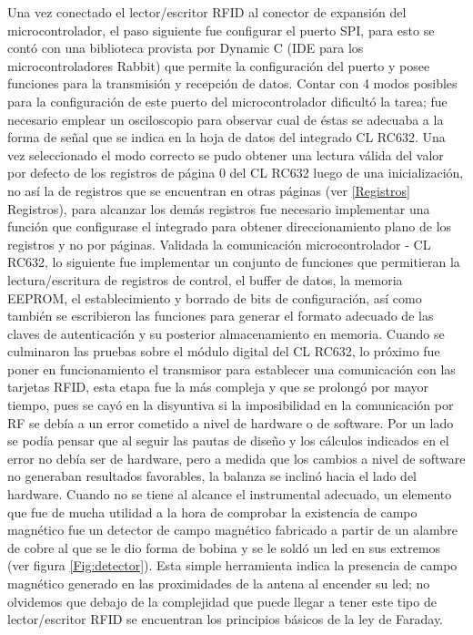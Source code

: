 Una vez conectado el lector/escritor RFID al conector de expansión del microcontrolador, el paso siguiente fue configurar el puerto SPI, para esto se contó con una biblioteca provista por Dynamic C (IDE para los microcontroladores Rabbit) que permite la configuración del puerto y posee funciones para la transmisión y recepción de datos. Contar con 4 modos posibles para la configuración de este puerto del microcontrolador dificultó la tarea; fue necesario emplear un osciloscopio para observar cual de éstas se adecuaba a la forma de señal que se indica en la hoja de datos del integrado  CL RC632. Una vez seleccionado el modo correcto se pudo obtener una lectura válida del valor por defecto de los registros de página 0 del CL RC632 luego de una inicialización, no así la de registros que se encuentran en otras páginas (ver \ref{Registros} Registros), para alcanzar los demás registros fue necesario implementar una función que configurase el integrado para obtener direccionamiento plano de los registros y no por páginas.
Validada la comunicación microcontrolador - CL RC632, lo siguiente fue implementar un conjunto de funciones que permitieran la lectura/escritura de registros de control, el buffer de datos, la memoria EEPROM, el establecimiento y borrado de bits de configuración, así como también se escribieron las funciones para generar el formato adecuado de las claves de autenticación y su posterior almacenamiento en memoria. 
Cuando se culminaron las pruebas sobre el módulo digital del  CL RC632, lo próximo fue poner en funcionamiento el transmisor para establecer una comunicación con las tarjetas RFID, esta etapa fue la más compleja y que se prolongó por mayor tiempo, pues se cayó en la disyuntiva si la imposibilidad en la comunicación por RF se debía a un error cometido a nivel de hardware o de software. Por un lado se podía pensar que al seguir las pautas de diseño y los cálculos indicados en \cite{MRICF} el error no debía ser de hardware, pero a medida que los cambios a nivel de software no generaban resultados favorables, la balanza se inclinó hacia el lado del hardware. Cuando no se tiene al alcance el instrumental adecuado, un elemento que fue de mucha utilidad a la hora de comprobar la existencia de campo magnético fue un detector de campo magnético fabricado a partir de un alambre de cobre al que se le dio forma de bobina y se le soldó un led en sus extremos (ver figura \ref{Fig:detector}). Esta simple herramienta indica la presencia de campo magnético generado en las proximidades de la antena al encender su led; no olvidemos que debajo de la complejidad que puede llegar a tener este tipo de lector/escritor RFID se encuentran los principios básicos de la ley de Faraday. 


